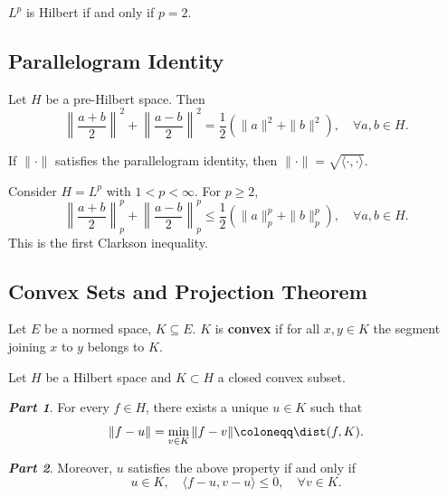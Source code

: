 \begin{remark}
$L^p$ is Hilbert if and only if $p = 2$.
\end{remark}

\clearpage
\subsection{Parallelogram Identity}

\begin{theorem}
Let $H$ be a pre-Hilbert space. Then
\[
\left\| \frac{a+b}{2} \right\|^2 + \left\| \frac{a-b}{2} \right\|^2 = \frac{1}{2} \left( \|a\|^2 + \|b\|^2 \right), \quad \forall a,b \in H.
\]
\end{theorem}

\begin{remark}
If $\|\cdot\|$ satisfies the parallelogram identity, then $\|\cdot\| = \sqrt{\langle \cdot, \cdot \rangle}$.
\end{remark}

\begin{remark}
Consider $H = L^p$ with $1 < p < \infty$. For $p \geq 2$,
\[
\left\| \frac{a+b}{2} \right\|_p^p + \left\| \frac{a-b}{2} \right\|_p^p \leq \frac{1}{2} \left( \|a\|_p^p + \|b\|_p^p \right), \quad \forall a,b \in H.
\]
This is the first Clarkson inequality.
\end{remark}

\subsection{Convex Sets and Projection Theorem}

\begin{definition}
Let $E$ be a normed space, $K \subseteq E$. $K$ is \textbf{convex} if for all $x,y \in K$ the segment joining $x$ to $y$ belongs to $K$.
\end{definition}

\begin{theorem}
Let $H$ be a Hilbert space and $K \subset H$ a closed convex subset. 

\textbf{\textit{Part 1}}. For every $f \in H$, there exists a unique $u \in K$ such that
\[
\|f - u\| = \min_{v \in K} \|f - v\| \coloneqq \dist(f, K).
\]

\textbf{\textit{Part 2}}. Moreover, $u$ satisfies the above property if and only if
\[
u \in K, \quad \langle f - u, v - u \rangle \leq 0, \quad \forall v \in K.
\]
\end{theorem}

